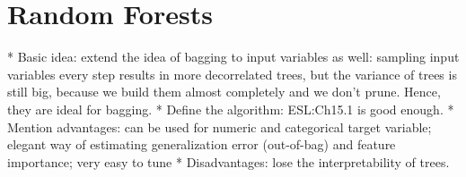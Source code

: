 \begin{refsection}
\begin{example}
\end{example}

\section{Random Forests}

* Basic idea: extend the idea of bagging to input variables as well: sampling input variables every step results in more decorrelated trees, but the variance of trees is still big, because we build them almost completely and we don't prune. Hence, they are ideal for bagging.
* Define the algorithm: ESL:Ch15.1 is good enough.
* Mention advantages: can be used for numeric and categorical target variable; elegant way of estimating generalization error (out-of-bag) and feature importance; very easy to tune
* Disadvantages: lose the interpretability of trees.


\printbibliography[heading=subbibliography]
\end{refsection}